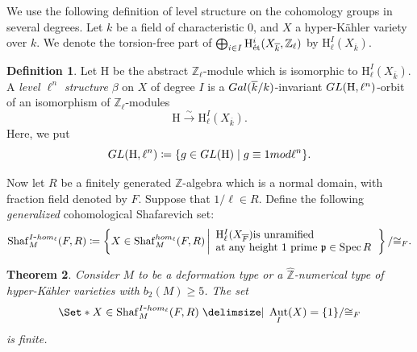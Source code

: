 \documentclass[11pt,reqno,oneside]{amsart}
\numberwithin{equation}{section}
\newtheorem{theorem}{Theorem}[section]
\theoremstyle{definition}
\newtheorem{definition}[theorem]{Definition}
\DeclareMathOperator{\Aut}{Aut}
\DeclareMathOperator{\Spec}{Spec}
\newcommand{\Gal}{{\rm Gal}}
\newcommand{\GL}{{\rm GL}}
\DeclareMathOperator{\et}{\Acute{e}t}
\renewcommand{\hom}{{\rm hom}}
\newcommand{\Sha}{\mathrm{Shaf}}
\newcommand\rH{\mathrm{H}}
\newcommand{\ZZ}{\mathbb{Z}}
\newcommand{\p}{\mathfrak{p}}
\begin{document}
We use the following definition of level structure on the cohomology groups in several degrees. Let $k$ be a field of characteristic $0$, and $X$ a hyper-Kähler variety over $k$.
We denote the torsion-free part of $\bigoplus_{i\in I}\rH^i_{\et}(X_{\overline{k}},\ZZ_{\ell})$ by $\rH^I_{\ell}(X_{\overline{k}})$.
\begin{definition}
Let $\rH$ be the abstract $\ZZ_{\ell}$-module which is isomorphic to $\rH^I_{\ell}(X_{\overline{k}})$.
A \emph{level $\ell^{n}$ structure} $\beta$ on $X$ of degree $I$ is a $\Gal(\overline{k}/k)$-invariant
$\GL(\rH,\ell^{n})$-orbit of an isomorphism of $\ZZ_{\ell}$-modules
\[
\rH \xrightarrow{\sim} \rH^I_{\ell}(X_{\overline{k}}).
\]
Here, we put
\[
\GL(\rH,\ell^{n}) \coloneqq\{g \in \GL (\rH) \mid g \equiv 1 \textup{ mod } \ell^{n} \}.
\]
\end{definition}

Now let $R$ be a finitely generated $\ZZ$-algebra which is a normal domain, with fraction field denoted by $F$. Suppose that $1/\ell \in R$.
Define the following \textit{generalized} cohomological Shafarevich set:
\begin{equation}
    \Sha_{M}^{I\hbox{-}\hom_\ell}(F,R)\coloneqq \left\{
  X\in \Sha_M^{\hom_\ell}(F,R) \left|
  \begin{array}{l}
    \rH^{I}_{\ell}(X_{\overline{F}}) \text{is unramified }\\
  \text{at any height 1 prime } \p\in \Spec R \\
  \end{array}
  \right.
\right\}/{\cong_F}.
\end{equation}

\begin{theorem}
\label{cohshaf}
Consider $M$ to be a deformation type or a $\widehat{\ZZ}$-numerical type of hyper-Kähler varieties with $b_2(M)\geq 5$. The set
\begin{equation}
\Set*{
  X\in \Sha_M^{I\hbox{-}\hom_\ell}(F,R) \given 
    \Aut_{I}(X)=\{1\}
}/{\cong_F}
\end{equation}
is finite.
\end{theorem}
\end{document}
